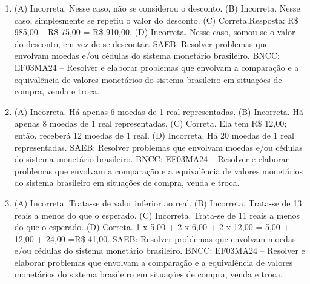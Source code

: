 \begin{enumerate}
\item
(A) Incorreta. Nesse caso, não se considerou o desconto.
(B) Incorreta. Nesse caso, simplesmente se repetiu o valor do desconto.
(C) Correta.Resposta: R\$ 985,00 -- R\$ 75,00 = R\$ 910,00.
(D) Incorreta. Nesse caso, somou-se o valor do desconto, em vez de se descontar.
SAEB: Resolver problemas que envolvam moedas e/ou cédulas do sistema monetário brasileiro. 
BNCC: EF03MA24 -- Resolver e elaborar problemas que envolvam a comparação e a equivalência de
valores monetários do sistema brasileiro em situações de compra, venda e troca.

\item
(A) Incorreta. Há apenas 6 moedas de 1 real representadas.
(B) Incorreta. Há apenas 8 moedas de 1 real representadas.
(C) Correta. Ela tem R\$ 12,00; então, receberá 12 moedas de 1 real.
(D) Incorreta. Há 20 moedas de 1 real representadas.
SAEB: Resolver problemas que envolvam moedas e/ou cédulas do sistema monetário brasileiro. 
BNCC: EF03MA24 -- Resolver e elaborar problemas que envolvam a comparação e a equivalência de
valores monetários do sistema brasileiro em situações de compra, venda e troca.

\item
(A) Incorreta. Trata-se de valor inferior ao real.
(B) Incorreta. Trata-se de 13 reais a menos do que o esperado.
(C) Incorreta. Trata-se de 11 reais a menos do que o esperado.
(D) Correta.
1 x 5,00 + 2 x 6,00 + 2 x 12,00 = 5,00 + 12,00 + 24,00 =R\$ 41,00.
SAEB: Resolver problemas que envolvam moedas e/ou cédulas do sistema monetário brasileiro. 
BNCC: EF03MA24 -- Resolver e elaborar problemas que envolvam a comparação e a equivalência de
valores monetários do sistema brasileiro em situações de compra, venda e troca.
\end{enumerate}


